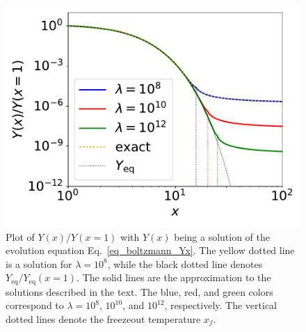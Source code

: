 \documentclass[12pt,twoside,book]{article}
\begin{document}
\begin{figure}[t]
 \centering
 \includegraphics[width=0.5\hsize]{DMrelic.pdf}
 \caption{Plot of $Y(x) / Y(x=1)$ with $Y(x)$ being a solution of the
 evolution equation Eq.~\eqref{eq_boltzmann_Yx}.  The yellow dotted line
 is a solution for $\lambda = 10^{8}$, while the black dotted line
 denotes $Y_{\mathrm{eq}} / Y_{\mathrm{eq}} (x=1)$.  The solid lines are
 the approximation to the solutions described in the text.  The blue,
 red, and green colors correspond to $\lambda = 10^8$, $10^{10}$, and
 $10^{12}$, respectively.  The vertical dotted lines denote the
 freezeout temperature $x_f$.}  \label{fig_DM_relic}
\end{figure}
\end{document}
